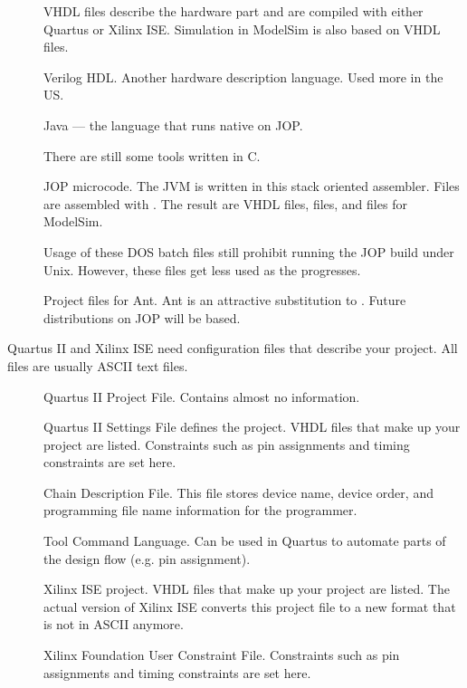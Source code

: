 \begin{description}

\item[] VHDL files describe the hardware part and are
compiled with either Quartus or Xilinx ISE. Simulation in ModelSim
is also based on VHDL files.
\item[] Verilog HDL. Another hardware description language.
Used more in the US.

\item[] Java --- the language that runs native on JOP.

\item[] There are still some tools written in C.

\item[] JOP microcode. The JVM is written in this stack
oriented assembler. Files are assembled with . The result
are VHDL files,  files, and  files for
ModelSim.

\item[] Usage of these DOS batch files still prohibit
running the JOP build under Unix. However, these files get less used
as the  progresses.

\item[] Project files for Ant. Ant is an attractive
substitution to . Future distributions on JOP will be
 based.

\end{description}


Quartus II and Xilinx ISE need configuration files that describe
your project. All files are usually ASCII text files.

\begin{description}

\item[] Quartus II Project File. Contains almost no
information.
\item[] Quartus II Settings File defines the project.
    VHDL files that make up your project are listed. Constraints
    such as pin assignments and timing constraints are set here.
\item[] Chain Description File. This file
stores device name, device order, and programming file name
information for the programmer.
\item[] Tool Command Language. Can be used in Quartus to
automate parts of the design flow (e.g. pin assignment).

\item[] Xilinx ISE project. VHDL files that make up
    your project are listed. The actual version of Xilinx ISE
    converts this project file to a new format that is not in
    ASCII anymore.
\item[] Xilinx Foundation User Constraint File.
    Constraints such as pin assignments and timing constraints
    are set here.

\end{description}

